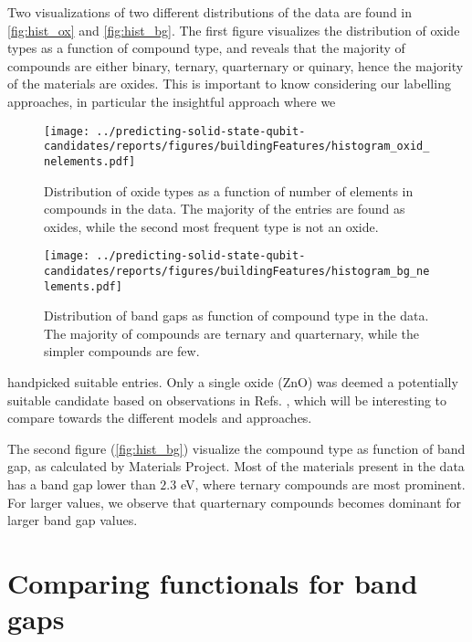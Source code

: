 Two visualizations of two different distributions of the data are found in \autoref{fig:hist_ox} and \autoref{fig:hist_bg}.
The first figure visualizes the distribution of oxide types as a function of compound type, and reveals that the majority of compounds are either binary, ternary, quarternary or quinary, hence the majority of the materials are oxides.
This is important to know considering our labelling approaches, in particular the insightful approach where we

\begin{figure}[]
      \centering
      \texttt{[image: ../predicting-solid-state-qubit-candidates/reports/figures/buildingFeatures/histogram\_oxid\_nelements.pdf]}
      \vspace*{-130mm}
      \caption{Distribution of oxide types as a function of number of elements in compounds in the data. The majority of the entries are found as oxides, while the second most frequent type is not an oxide. }
      \label{fig:hist_ox}
\end{figure}

\begin{figure}[]
      \centering
      \texttt{[image: ../predicting-solid-state-qubit-candidates/reports/figures/buildingFeatures/histogram\_bg\_nelements.pdf]}
      \vspace*{-130mm}
      \caption{Distribution of band gaps as function of compound type in the data. The majority of compounds are ternary and quarternary, while the simpler compounds are few.}
      \label{fig:hist_bg}
\end{figure}

\noindent handpicked suitable entries.
Only a single oxide (ZnO) was deemed a potentially suitable candidate based on observations in Refs. \cite{Zhang2020, Zheng2014, Morfa2012}, which will be interesting to compare towards the different models and approaches.



The second figure (\autoref{fig:hist_bg}) visualize the compound type as function of band gap, as calculated by Materials Project. Most of the materials present in the data has a band gap lower than $2.3$ eV, where ternary compounds are most prominent. For larger values, we observe that quarternary compounds becomes dominant for larger band gap values.

\section{Comparing functionals for band gaps}


